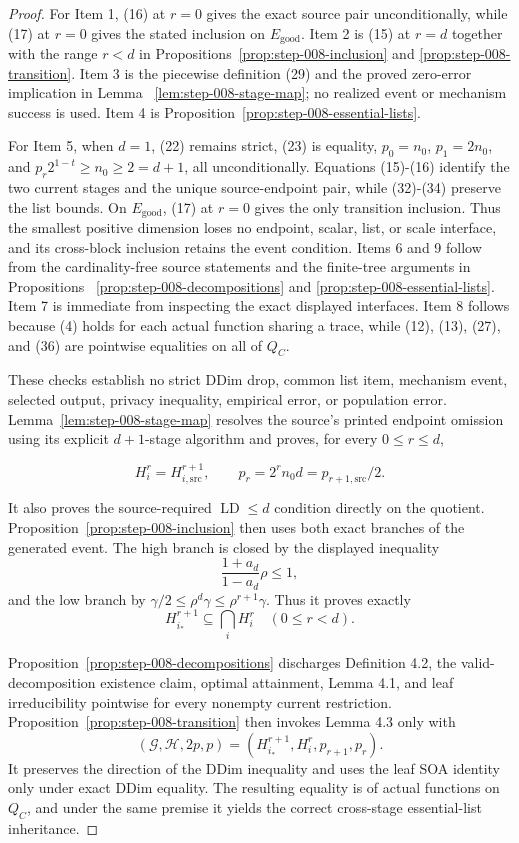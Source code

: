 \begin{proof}
For Item 1, (16) at \(r=0\) gives the exact source pair unconditionally,
while (17) at \(r=0\) gives the stated inclusion on
\(E_{\mathrm{good}}\). Item 2 is (15) at \(r=d\) together with the range
\(r<d\) in Propositions~\ref{prop:step-008-inclusion} and
\ref{prop:step-008-transition}. Item 3 is the piecewise definition (29)
and the proved zero-error implication in Lemma
~\ref{lem:step-008-stage-map}; no realized event or mechanism success is
used. Item 4 is Proposition~\ref{prop:step-008-essential-lists}.

For Item 5, when \(d=1\), (22) remains strict, (23) is equality,
\(p_0=n_0\), \(p_1=2n_0\), and
\(p_r2^{1-t}\ge n_0\ge2=d+1\), all unconditionally. Equations (15)-(16)
identify the two current stages and the unique source-endpoint pair, while
(32)-(34) preserve the list bounds. On \(E_{\mathrm{good}}\), (17) at
\(r=0\) gives the only transition inclusion. Thus the smallest positive
dimension loses no endpoint, scalar, list, or scale interface, and its
cross-block inclusion retains the event condition. Items 6 and 9 follow
from the cardinality-free source
statements and the finite-tree arguments in Propositions
~\ref{prop:step-008-decompositions} and
\ref{prop:step-008-essential-lists}. Item 7 is immediate from inspecting
the exact displayed interfaces. Item 8 follows because (4) holds for each
actual function sharing a trace, while (12), (13), (27), and (36) are
pointwise equalities on all of \(Q_C\).

These checks establish no strict DDim drop, common list item, mechanism
event, selected output, privacy inequality, empirical error, or population
error. 
Lemma~\ref{lem:step-008-stage-map} resolves the source's printed endpoint
omission using its explicit \(d+1\)-stage algorithm and proves, for every
\(0\le r\le d\),

\[
 H_i^r=H_{i,\mathrm{src}}^{r+1},
 \qquad
 p_r=2^rn_0d=p_{r+1,\mathrm{src}}/2.
\]

It also proves the source-required \(\operatorname{LD}\le d\) condition
directly on the quotient. Proposition~\ref{prop:step-008-inclusion} then
uses both exact branches of the  generated event. The high branch
is closed by the displayed inequality
\[
 \frac{1+a_d}{1-a_d}\rho\le1,
\]
and the low branch by
\(\gamma/2\le\rho^d\gamma\le\rho^{r+1}\gamma\). Thus it proves exactly
\[
 H_{i_*}^{r+1}\subseteq\bigcap_iH_i^r
 \quad(0\le r<d).
\]

Proposition~\ref{prop:step-008-decompositions} discharges Definition 4.2,
the valid-decomposition existence claim, optimal attainment, Lemma 4.1,
and leaf irreducibility pointwise for every nonempty current restriction.
Proposition~\ref{prop:step-008-transition} then invokes Lemma 4.3 only with
\[
 (\mathcal G,\mathcal H,2p,p)
 =(H_{i_*}^{r+1},H_i^r,p_{r+1},p_r).
\]
It preserves the direction of the DDim inequality and uses the leaf SOA
identity only under exact DDim equality. The resulting equality is of
actual functions on \(Q_C\), and under the same premise it yields the
correct cross-stage essential-list inheritance.


\end{proof}
